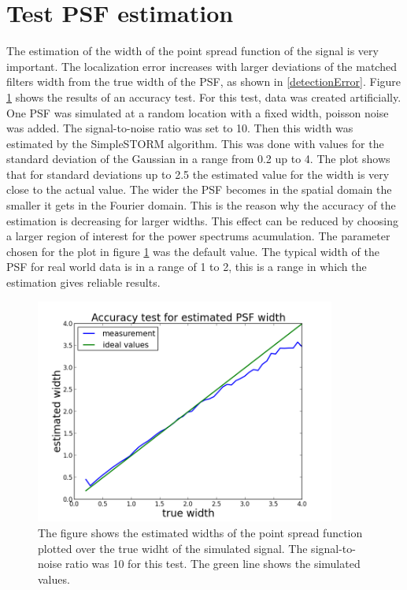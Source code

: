 \section{Test PSF estimation}
The estimation of the width of the point spread function of the signal is very important. The localization error increases with larger deviations of the matched filters width from the true width of the PSF, as shown in \ref{detectionError}. \newline
Figure \ref{estimatedSigma} shows the results of an accuracy test. For this test, data was created artificially. One PSF was simulated at a random location with a fixed width, poisson noise was added. The signal-to-noise ratio was set to 10. Then this width was estimated by the SimpleSTORM algorithm. This was done with values for the standard deviation of the Gaussian in a range from 0.2 up to 4. The plot shows that for standard deviations up to 2.5 the estimated value for the width is very close to the actual value. The wider the PSF becomes in the spatial domain the smaller it gets in the Fourier domain. This is the reason why the accuracy of the estimation is decreasing for larger widths. This effect can be reduced by choosing a larger region of interest for the power spectrums acumulation. The parameter chosen for the plot in figure \ref{estimatedSigma} was the default value. The typical width of the PSF for real world data is in a range of 1 to 2, this is a range in which the estimation gives reliable results.\newline
\begin{figure}
\centering
\includegraphics[width = 0.88\textwidth]{pictures/AccuracyTestPSFWidth.png}
	 \caption{The figure shows the estimated widths of the point spread function plotted over the true widht of the simulated signal. The signal-to-noise ratio was 10 for this test. The green line shows the simulated values.}
	\label{estimatedSigma}
\end{figure}


